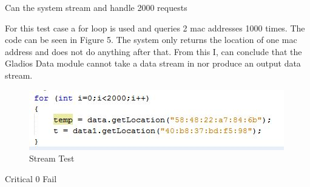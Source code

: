 {Can the system stream and handle 2000 requests} 
{For this test case a for loop is used and queries 2 mac addresses 1000 times. The code can be seen in Figure 5. The system only returns the location of one mac address and does not do anything after that. From this I, can conclude that the Gladios Data module cannot take a data stream in nor produce an output data stream.
	\begin{figure}[h]
		\centering
		\includegraphics{stream_test.jpg}
		\caption{Stream Test}
		\label{fig:Output}
	\end{figure} 
}
{Critical}
{0}
{Fail}	


